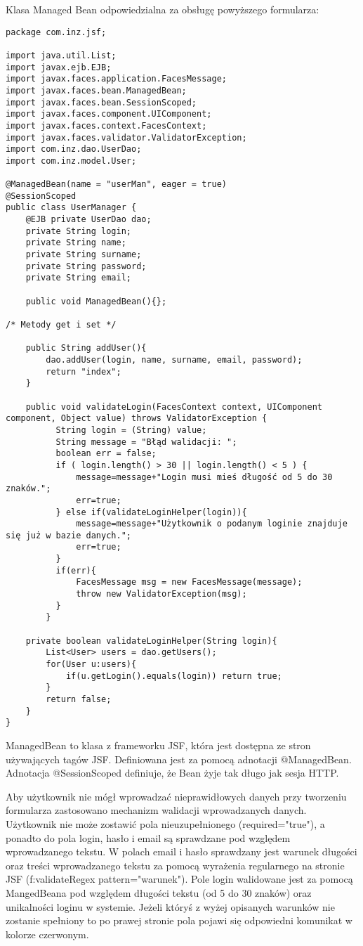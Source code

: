 Klasa Managed Bean odpowiedzialna za obsługę powyższego formularza:
\begin{lstlisting}[breaklines=true]
package com.inz.jsf;

import java.util.List;
import javax.ejb.EJB;
import javax.faces.application.FacesMessage;
import javax.faces.bean.ManagedBean;
import javax.faces.bean.SessionScoped;
import javax.faces.component.UIComponent;
import javax.faces.context.FacesContext;
import javax.faces.validator.ValidatorException;
import com.inz.dao.UserDao;
import com.inz.model.User;

@ManagedBean(name = "userMan", eager = true)
@SessionScoped
public class UserManager {
	@EJB private UserDao dao;
	private String login;
	private String name;
	private String surname;
	private String password;
	private String email;
	
	public void ManagedBean(){};
	
/* Metody get i set */

	public String addUser(){
		dao.addUser(login, name, surname, email, password);
		return "index";
	}
	
	public void validateLogin(FacesContext context, UIComponent component, Object value) throws ValidatorException {
		  String login = (String) value;
		  String message = "Błąd walidacji: ";
		  boolean err = false;
		  if ( login.length() > 30 || login.length() < 5 ) {
			  message=message+"Login musi mieś długość od 5 do 30 znaków.";
			  err=true;
		  } else if(validateLoginHelper(login)){
			  message=message+"Użytkownik o podanym loginie znajduje się już w bazie danych.";
			  err=true;
		  }  
		  if(err){
			  FacesMessage msg = new FacesMessage(message);
		      throw new ValidatorException(msg);
		  }
		}
	
	private boolean validateLoginHelper(String login){
		List<User> users = dao.getUsers();
		for(User u:users){
			if(u.getLogin().equals(login)) return true;
		}
		return false;
	}
}
\end{lstlisting}

ManagedBean to klasa z frameworku JSF, która jest dostępna ze stron używających tagów JSF. Definiowana jest za pomocą adnotacji @ManagedBean. Adnotacja @SessionScoped definiuje, że Bean żyje tak długo jak sesja HTTP. 

Aby użytkownik nie mógł wprowadzać nieprawidłowych danych przy tworzeniu formularza zastosowano mechanizm walidacji wprowadzanych danych. Użytkownik nie może zostawić pola nieuzupełnionego (required="true"), a ponadto do pola login, hasło i email są sprawdzane pod względem wprowadzanego tekstu. W polach email i hasło sprawdzany jest warunek długości oraz treści wprowadzanego tekstu za pomocą wyrażenia regularnego na stronie JSF (f:validateRegex pattern="warunek"). Pole login walidowane jest za pomocą MangedBeana pod względem długości tekstu (od 5 do 30 znaków) oraz unikalności loginu w systemie. Jeżeli któryś z wyżej opisanych warunków nie zostanie spełniony to po prawej stronie pola pojawi się odpowiedni komunikat w kolorze czerwonym.

